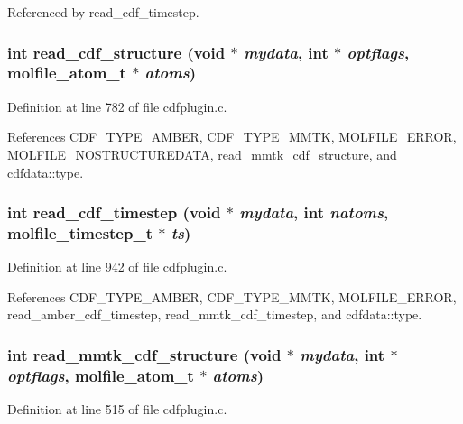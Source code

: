 Referenced by read\_\-cdf\_\-timestep.
\subsubsection{\setlength{\rightskip}{0pt plus 5cm}int read\_\-cdf\_\-structure (void $\ast$ {\em mydata}, int $\ast$ {\em optflags}, {\bf molfile\_\-atom\_\-t} $\ast$ {\em atoms})\hspace{0.3cm}{\tt  [static]}}\label{cdfplugin_8c_a13}




Definition at line 782 of file cdfplugin.c.

References CDF\_\-TYPE\_\-AMBER, CDF\_\-TYPE\_\-MMTK, MOLFILE\_\-ERROR, MOLFILE\_\-NOSTRUCTUREDATA, read\_\-mmtk\_\-cdf\_\-structure, and cdfdata::type.
\subsubsection{\setlength{\rightskip}{0pt plus 5cm}int read\_\-cdf\_\-timestep (void $\ast$ {\em mydata}, int {\em natoms}, {\bf molfile\_\-timestep\_\-t} $\ast$ {\em ts})\hspace{0.3cm}{\tt  [static]}}\label{cdfplugin_8c_a16}




Definition at line 942 of file cdfplugin.c.

References CDF\_\-TYPE\_\-AMBER, CDF\_\-TYPE\_\-MMTK, MOLFILE\_\-ERROR, read\_\-amber\_\-cdf\_\-timestep, read\_\-mmtk\_\-cdf\_\-timestep, and cdfdata::type.
\subsubsection{\setlength{\rightskip}{0pt plus 5cm}int read\_\-mmtk\_\-cdf\_\-structure (void $\ast$ {\em mydata}, int $\ast$ {\em optflags}, {\bf molfile\_\-atom\_\-t} $\ast$ {\em atoms})\hspace{0.3cm}{\tt  [static]}}\label{cdfplugin_8c_a12}




Definition at line 515 of file cdfplugin.c.

